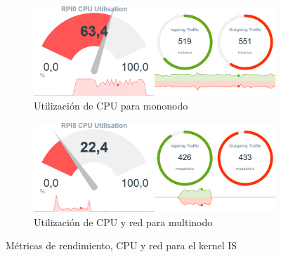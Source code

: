 \begin{figure}[htpb]
    \begin{subfigure}[c]{0.75\textwidth}
        \includegraphics[width=\textwidth]{img/benchmark_rev/is_rev_sn.png}
        \caption{Utilización de CPU para mononodo}
        \label{fig:mops_rev_sn__is}
    \end{subfigure}

    \vspace{0.5cm}
    
    \begin{subfigure}[c]{0.75\textwidth}
        \includegraphics[width=\textwidth]{img/benchmark_rev/is_rev_mn.png}
        \caption{Utilización de CPU y red para multinodo}
        \label{fig:mops_rev_mn__is}
    \end{subfigure}
    \caption{Métricas de rendimiento, CPU y red para el kernel IS}
    \label{fig:mops__is}
\end{figure}

